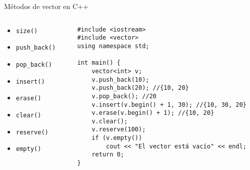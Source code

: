 \documentclass{beamer}
\begin{document}
\begin{frame}[fragile]{Métodos de vector en C++}
\begin{columns}
\begin{column}{0.3\textwidth}
    \begin{itemize}
\item \texttt{size()}
\item \texttt{push\_back()}
\item \texttt{pop\_back()}
\item \texttt{insert()}
\item \texttt{erase()}
\item \texttt{clear()}
\item \texttt{reserve()}
\item \texttt{empty()}
    \end{itemize}
\end{column}

    \begin{column}{0.7\textwidth}
    \begin{verbatim}
#include <iostream>
#include <vector>
using namespace std;

int main() {
    vector<int> v;
    v.push_back(10);
    v.push_back(20); //{10, 20}
    v.pop_back(); //20
    v.insert(v.begin() + 1, 30); //{10, 30, 20}
    v.erase(v.begin() + 1); //{10, 20}
    v.clear();
    v.reserve(100);
    if (v.empty())
        cout << "El vector está vacío" << endl;
    return 0;
}
    \end{verbatim}
        \end{column}
\end{columns}

\end{frame}
\end{document}
